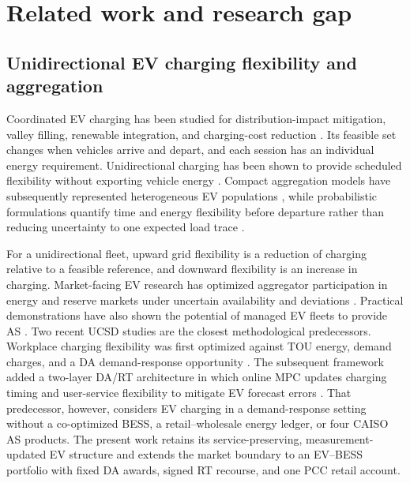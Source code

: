 \documentclass[final,5p,times]{elsarticle}
\begin{document}
\section{Related work and research gap}
\label{sec:literature}
\label{sec:related_work}

\subsection{Unidirectional EV charging flexibility and aggregation}
Coordinated EV charging has been studied for distribution-impact mitigation, valley filling, renewable integration, and charging-cost reduction \cite{clement2010impact,sortomme2011optimal,gan2013optimal,richardson2013electric}. Its feasible set changes when vehicles arrive and depart, and each session has an individual energy requirement. Unidirectional charging has been shown to provide scheduled flexibility without exporting vehicle energy \cite{sortomme2011optimal}. Compact aggregation models have subsequently represented heterogeneous EV populations \cite{zheng2013aggregation,nazari2022updated,alTaha2025aggregateFlex}, while probabilistic formulations quantify time and energy flexibility before departure rather than reducing uncertainty to one expected load trace \cite{huber2020probabilistic}.

For a unidirectional fleet, upward grid flexibility is a reduction of charging relative to a feasible reference, and downward flexibility is an increase in charging. Market-facing EV research has optimized aggregator participation in energy and reserve markets under uncertain availability and deviations \cite{vagropoulos2013optimal,bessa2014optimization}. Practical demonstrations have also shown the potential of managed EV fleets to provide AS \cite{deforest2018lafb}. Two recent UCSD studies are the closest methodological predecessors. Workplace charging flexibility was first optimized against TOU energy, demand charges, and a DA demand-response opportunity \cite{chen2024costoptimal}. The subsequent framework added a two-layer DA/RT architecture in which online MPC updates charging timing and user-service flexibility to mitigate EV forecast errors \cite{chen2026realtime}. That predecessor, however, considers EV charging in a demand-response setting without a co-optimized BESS, a retail--wholesale energy ledger, or four CAISO AS products. The present work retains its service-preserving, measurement-updated EV structure and extends the market boundary to an EV--BESS portfolio with fixed DA awards, signed RT recourse, and one PCC retail account.
\end{document}
